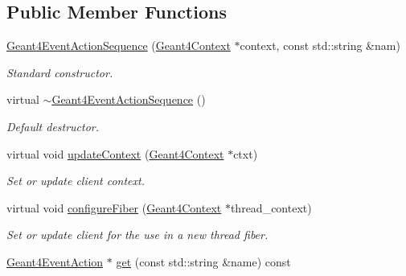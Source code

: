 \subsection*{Public Member Functions}
\begin{DoxyCompactItemize}
\item 
\hyperlink{class_d_d4hep_1_1_simulation_1_1_geant4_event_action_sequence_ad77330c1ed08133eaf312eca7a7ffe79}{Geant4EventActionSequence} (\hyperlink{class_d_d4hep_1_1_simulation_1_1_geant4_context}{Geant4Context} $\ast$context, const std::string \&nam)
\begin{DoxyCompactList}\small\item\em Standard constructor. \item\end{DoxyCompactList}\item 
virtual \hyperlink{class_d_d4hep_1_1_simulation_1_1_geant4_event_action_sequence_af5bbb63ed3aceb9249cbba78c47fd241}{$\sim$Geant4EventActionSequence} ()
\begin{DoxyCompactList}\small\item\em Default destructor. \item\end{DoxyCompactList}\item 
virtual void \hyperlink{class_d_d4hep_1_1_simulation_1_1_geant4_event_action_sequence_a26291513e94aec2a01464d0121532999}{updateContext} (\hyperlink{class_d_d4hep_1_1_simulation_1_1_geant4_context}{Geant4Context} $\ast$ctxt)
\begin{DoxyCompactList}\small\item\em Set or update client context. \item\end{DoxyCompactList}\item 
virtual void \hyperlink{class_d_d4hep_1_1_simulation_1_1_geant4_event_action_sequence_a552fac0ec8632b417f81453b4d79e0c4}{configureFiber} (\hyperlink{class_d_d4hep_1_1_simulation_1_1_geant4_context}{Geant4Context} $\ast$thread\_\-context)
\begin{DoxyCompactList}\small\item\em Set or update client for the use in a new thread fiber. \item\end{DoxyCompactList}\item 
\hyperlink{class_d_d4hep_1_1_simulation_1_1_geant4_event_action}{Geant4EventAction} $\ast$ \hyperlink{class_d_d4hep_1_1_simulation_1_1_geant4_event_action_sequence_a3c02fae6b8cad1aa2d663716fd19af53}{get} (const std::string \&name) const 

\end{DoxyCompactItemize}
